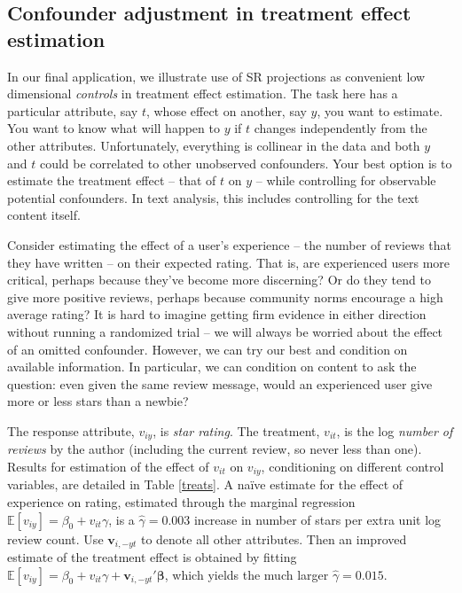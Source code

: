 \documentclass[12pt]{article}
\newcommand{\bs}[1]{\boldsymbol{#1}}
\newcommand{\bm}[1]{\mathbf{#1}}
\newcommand{\ds}[1]{\mathds{#1}}
\begin{document}
\subsection{Confounder adjustment in treatment effect estimation}

In our final application, we illustrate use of SR projections as convenient low
dimensional {\it controls} in treatment effect estimation.  The task here has
a particular attribute, say $t$, whose effect on another, say $y$, you want to
estimate.  You want to know what will happen to $y$ if $t$ changes
independently from  the other attributes.  Unfortunately, everything is
collinear in the data and both $y$ and $t$ could be correlated to other
unobserved confounders.  Your best option is to estimate the treatment effect
-- that of $t$ on $y$ -- while controlling for observable potential
confounders.  In text analysis, this includes controlling for the text content
itself.


Consider estimating the effect of a user's experience -- the number of reviews
that they have written -- on their expected rating.  That is, are experienced
users more critical, perhaps because they've become more discerning?  Or do
they tend to give more positive reviews, perhaps because community norms
encourage a high average rating? It is hard to imagine getting firm evidence
in either direction without running a randomized trial -- we will always be
worried about the effect of an omitted confounder.  However, we can try our
best and condition on available information.    In particular, we can
condition on  content to ask the question: even given the same review
message, would an experienced user give more or less stars than a newbie?

The response attribute, $v_{iy}$, is  {\it star rating}. The treatment, $v_{it}$, is the log {\it number of reviews} by the author
(including the current review, so never less than one).  Results for
estimation of the effect of $v_{it}$ on $v_{iy}$, conditioning on different
control variables, are detailed in Table \ref{treats}.   A na\"ive estimate
for the effect of experience on rating, estimated through the marginal
regression $\ds{E}[v_{iy}] = \beta_0 +  v_{it}\gamma$, is a $\hat\gamma =
0.003$ increase in number of stars per extra unit log review count. Use
$\bm{v}_{i,-yt}$ to denote all other attributes.  Then an improved estimate of
the treatment effect is obtained by fitting $\ds{E}[v_{iy}] = \beta_0 +
v_{it}\gamma +
\bm{v}_{i,-yt}'\bs{\beta}$, which yields the much larger $\hat\gamma = 0.015$.
\end{document}
